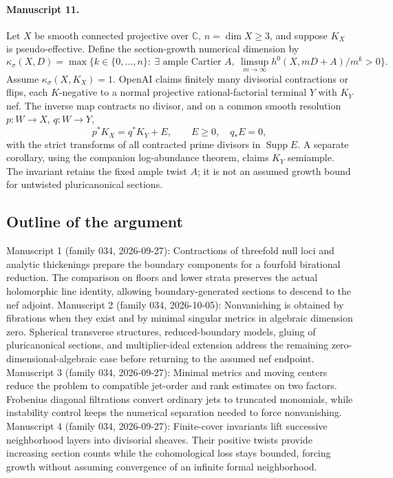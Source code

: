 \documentclass[11pt]{article}
\begin{document}
\paragraph{Manuscript 11.}
Let $X$ be smooth connected projective over $\mathbb C$, $n=\dim X\ge3$, and suppose $K_X$ is pseudo-effective. Define the section-growth numerical dimension by
\[
\kappa_\sigma(X,D)=\max\{k\in\{0,\ldots,n\}:\ \exists\text{ ample Cartier }A,\ \limsup_{m\to\infty}h^0(X,mD+A)/m^k>0\}.
\]
Assume $\kappa_\sigma(X,K_X)=1$. OpenAI claims finitely many divisorial contractions or flips, each $K$-negative to a normal projective rational-factorial terminal $Y$ with $K_Y$ nef. The inverse map contracts no divisor, and on a common smooth resolution $p:W\to X$, $q:W\to Y$,
\[
p^*K_X=q^*K_Y+E,\qquad E\ge0,\quad q_*E=0,
\]
with the strict transforms of all contracted prime divisors in $\operatorname{Supp}E$. A separate corollary, using the companion log-abundance theorem, claims $K_Y$ semiample. The invariant retains the fixed ample twist $A$; it is not an assumed growth bound for untwisted pluricanonical sections.

\subsection{Outline of the argument}
Manuscript 1 (family 034, 2026-09-27): Contractions of threefold null loci and analytic thickenings prepare the boundary components for a fourfold birational reduction. The comparison on floors and lower strata preserves the actual holomorphic line identity, allowing boundary-generated sections to descend to the nef adjoint. Manuscript 2 (family 034, 2026-10-05): Nonvanishing is obtained by fibrations when they exist and by minimal singular metrics in algebraic dimension zero. Spherical transverse structures, reduced-boundary models, gluing of pluricanonical sections, and multiplier-ideal extension address the remaining zero-dimensional-algebraic case before returning to the assumed nef endpoint. Manuscript 3 (family 034, 2026-09-27): Minimal metrics and moving centers reduce the problem to compatible jet-order and rank estimates on two factors. Frobenius diagonal filtrations convert ordinary jets to truncated monomials, while instability control keeps the numerical separation needed to force nonvanishing. Manuscript 4 (family 034, 2026-09-27): Finite-cover invariants lift successive neighborhood layers into divisorial sheaves. Their positive twists provide increasing section counts while the cohomological loss stays bounded, forcing growth without assuming convergence of an infinite formal neighborhood.
\end{document}
